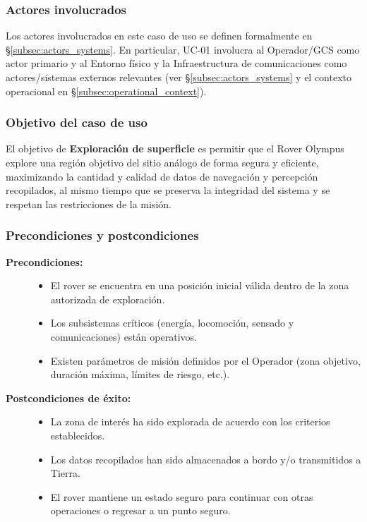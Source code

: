 \subsubsection{Actores involucrados}\label{subsec:uc01_actors}
Los actores involucrados en este caso de uso se definen formalmente en §\ref{subsec:actors_systems}. En particular, UC-01 involucra al Operador/GCS como actor primario y al Entorno físico y la Infraestructura de comunicaciones como actores/sistemas externos relevantes (ver §\ref{subsec:actors_systems} y el contexto operacional en §\ref{subsec:operational_context}).

\subsubsection{Objetivo del caso de uso}

El objetivo de \textbf{Exploración de superficie} es permitir que el Rover Olympus explore una región objetivo del sitio análogo de forma segura y eficiente, maximizando la cantidad y calidad de datos de navegación y percepción recopilados, al mismo tiempo que se preserva la integridad del sistema y se respetan las restricciones de la misión.

\subsubsection{Precondiciones y postcondiciones}

\begin{description}
  \item[\textbf{Precondiciones:}]
  \begin{itemize}
    \item El rover se encuentra en una posición inicial válida dentro de la zona autorizada de exploración.
    \item Los subsistemas críticos (energía, locomoción, sensado y comunicaciones) están operativos.
    \item Existen parámetros de misión definidos por el Operador (zona objetivo, duración máxima, límites de riesgo, etc.).
  \end{itemize}

  \item[\textbf{Postcondiciones de éxito:}]
  \begin{itemize}
    \item La zona de interés ha sido explorada de acuerdo con los criterios establecidos.
    \item Los datos recopilados han sido almacenados a bordo y/o transmitidos a Tierra.
    \item El rover mantiene un estado seguro para continuar con otras operaciones o regresar a un punto seguro.
  \end{itemize}
\end{description}

